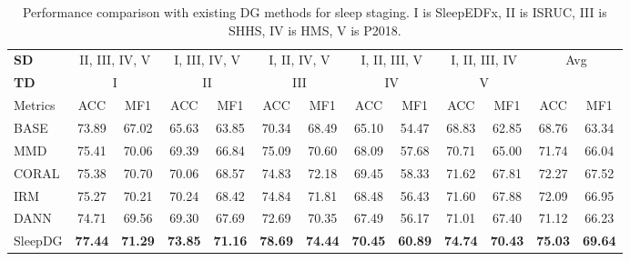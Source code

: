 \documentclass[letterpaper]{article} %
\begin{document}
	\begin{table}[tb]
		\centering
		\small
		\begin{tabular}{lcccccccccccc} 
			\toprule
			\textbf{SD}& \multicolumn{2}{c}{II, III, IV, V} & \multicolumn{2}{c}{I, III, IV, V} & \multicolumn{2}{c}{I, II, IV, V} & \multicolumn{2}{c}{I, II, III, V} & \multicolumn{2}{c}{I, II, III, IV}& \multicolumn{2}{c}{\multirow{2}{*}{Avg}}\\
			\cmidrule(lr){1-1}\cmidrule(lr){2-3}\cmidrule(lr){4-5}\cmidrule(lr){6-7}\cmidrule(lr){8-9}\cmidrule(lr){10-11}
			\textbf{TD}&\multicolumn{2}{c}{I} & \multicolumn{2}{c}{II} & \multicolumn{2}{c}{III} & \multicolumn{2}{c}{IV} & \multicolumn{2}{c}{V}&&\\
			\cmidrule(lr){1-1}\cmidrule(lr){2-3}\cmidrule(lr){4-5}\cmidrule(lr){6-7}\cmidrule(lr){8-9}\cmidrule(lr){10-11}\cmidrule(lr){12-13}
			Metrics& ACC & MF1 & ACC & MF1 & ACC & MF1 & ACC & MF1 & ACC & MF1 & ACC & MF1 \\
			\midrule
			BASE&73.89&67.02&65.63&63.85&70.34&68.49&65.10&54.47&68.83&62.85&68.76&63.34\\
			MMD&75.41&70.06&69.39&66.84&75.09&70.60&68.09&57.68&70.71&65.00&71.74&66.04\\
			CORAL&75.38&70.70&70.06&68.57&74.83&72.18&69.45&58.33&71.62&67.81&72.27&67.52\\
			IRM&75.27&70.21&70.24&68.42&74.84&71.81&68.48&56.43&71.60&67.88&72.09&66.95\\
			DANN&74.71&69.56&69.30&67.69&72.69&70.35&67.49&56.17&71.01&67.40&71.12&66.23\\
			\midrule
			SleepDG&\textbf{77.44}&\textbf{71.29}&\textbf{73.85}&\textbf{71.16}&\textbf{78.69}&\textbf{74.44}&\textbf{70.45}&\textbf{60.89}&\textbf{74.74}&\textbf{70.43}&\textbf{75.03}&\textbf{69.64}\\
			\bottomrule
		\end{tabular}
		\caption{Performance comparison with existing DG methods for sleep staging. I is SleepEDFx, II is ISRUC, III is SHHS, IV is HMS, V is P2018.}	\label{tab:CompDG}
	\end{table}
	
\end{document}
